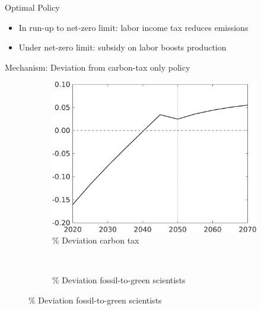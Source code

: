 \documentclass[11pt,aspectratio=169]{beamer}
\begin{document}
\begin{frame}{Optimal Policy}
\begin{figure}[h!!]
\begin{subfigure}{0.4\textwidth}
		\end{subfigure}
	\end{figure}
	\pause
	\begin{itemize}
		\item In run-up to net-zero limit: labor income tax reduces emissions
		\item Under net-zero limit: subsidy on labor boosts production
	\end{itemize}
\end{frame}

\begin{frame}{Mechanism: Deviation from carbon-tax only policy}
	\pause
	\begin{figure}[h!!]
		\begin{subfigure}{0.4\textwidth}
		\caption{{\% Deviation carbon tax}}
		\includegraphics[width=1\textwidth]{../codding_model/own_basedOnFried/optimalPol_010922_revision/figures/all_13Sept22_Tplus30/Tauf_OPT_T_NoTaus_COMPtaulPer_regime4_spillover0_knspil0_noskill0_sep0_xgrowth0_PV1_etaa0.79.png}
	\end{subfigure}
\begin{minipage}[]{0.1\textwidth}
\ 
\end{minipage}
\begin{subfigure}{0.4\textwidth}
	\caption{{\% Deviation fossil-to-green scientists}}

\end{subfigure}
\end{figure}
\end{frame}
\end{document}
